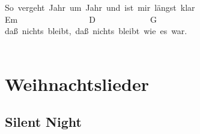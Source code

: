 \documentclass[]{book}
\let\stdsection\section
\renewcommand\section{\clearpage\stdsection}
\begin{document}
So~vergeht~Jahr~um~Jahr~und~ist~mir~längst~klar\\
\hspace*{0.333em}\hspace*{0.333em}\hspace*{0.333em}\hspace*{0.333em}\hspace*{0.333em}\hspace*{0.333em}\hspace*{0.333em}\hspace*{0.333em}\hspace*{0.333em}\hspace*{0.333em}\hspace*{0.333em}Em~~~~~~~~~~~~~~~~~D~~~~~~~~~~~~~G\\
daß~nichts~bleibt,~daß~nichts~bleibt~wie~es~war.\\
~\\

\hypertarget{weihnachtslieder}{%
\chapter{Weihnachtslieder}\label{weihnachtslieder}}

\hypertarget{silent-night}{%
\section{Silent Night}\label{silent-night}}
\end{document}
